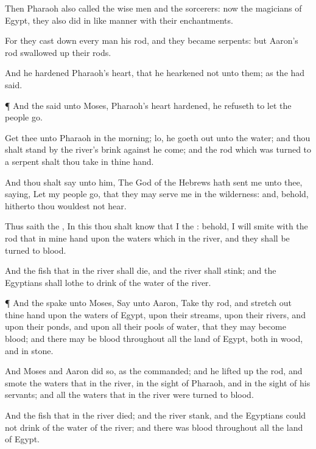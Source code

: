 {Then
Pharaoh also
called the wise
men and the
sorcerers: now the
magicians of
Egypt, they also
did in like
manner with their
enchantments.

For they cast
down every
man his
rod, and they became
serpents: but
Aaron’s
rod swallowed
up their
rods.

And he
hardened
Pharaoh’s
heart, that he
hearkened not unto them; as the
{} had
said.


\par }{\PP {}¶ And the
{}
said unto
Moses,
Pharaoh’s
heart
{}
hardened, he
refuseth to let the
people
go.

Get thee unto
Pharaoh in the
morning; lo, he goeth
out unto the
water; and thou shalt
stand by the
river’s
brink against he
come; and the
rod which was
turned to a
serpent shalt thou
take in thine
hand.

And thou shalt
say unto him, The
{}
God of the
Hebrews hath
sent me unto thee,
saying, Let my
people
go, that they may
serve me in the
wilderness: and, behold,
hitherto thou wouldest not
hear.

Thus
saith the
{}, In this thou shalt
know that I
{} the
{}: behold, I will
smite with the
rod that
{} in mine
hand upon the
waters which
{} in the
river, and they shall be
turned to
blood.

And the
fish that
{} in the
river shall
die, and the
river shall
stink; and the
Egyptians shall
lothe to
drink of the
water of the
river.


\par }{\PP {}¶ And the
{}
spake unto
Moses,
Say unto
Aaron,
Take thy
rod, and stretch
out thine
hand upon the
waters of
Egypt, upon their
streams, upon their
rivers, and upon their
ponds, and upon all their
pools of
water, that they may become
blood; and
{} there may be
blood throughout all the
land of
Egypt, both in
{}
wood, and in
{}
stone.

And
Moses and
Aaron
did so, as the
{}
commanded; and he lifted
up the
rod, and
smote the
waters that
{} in the
river, in the
sight of
Pharaoh, and in the
sight of his
servants; and all the
waters that
{} in the
river were
turned to
blood.

And the
fish that
{} in the
river
died; and the
river
stank, and the
Egyptians
could not
drink of the
water of the
river; and there was
blood throughout all the
land of
Egypt.

}
